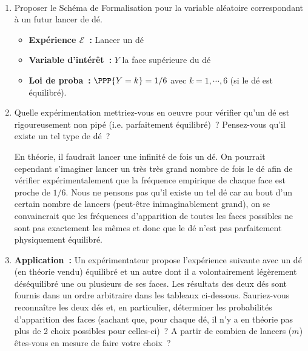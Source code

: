 \documentclass[10pt]{report}
\begin{document}
\begin{exercice}[Lancer d'un dé] ${ }$\label{ex:des}

\begin{enumerate}
\item Proposer le Schéma de Formalisation pour la variable aléatoire correspondant à un futur lancer de dé.\\
\begin{Correction}
\begin{itemize}
\item \textbf{Expérience $\mathcal{E}$~:} Lancer un dé
\item \textbf{Variable d'intérêt~:} $Y$ la face supérieure du dé
\item \textbf{Loi de proba~:} $\PPP{Y=k}=1/6$ avec $k=1,\cdots,6$ (si le dé est équilibré).
\end{itemize}
\end{Correction} 

\item Quelle expérimentation mettriez-vous en oeuvre pour vérifier qu'un dé est rigoureusement non pipé (i.e. parfaitement équilibré)~? Pensez-vous qu'il existe un tel type de dé~?

\begin{Correction}En théorie, il faudrait lancer une infinité de fois un dé. On pourrait cependant s'imaginer lancer un très très grand nombre de fois le dé afin de vérifier expérimentalement que la fréquence empirique de chaque face est proche de $1/6$. Nous ne pensons pas qu'il existe un tel dé car au bout d'un certain nombre de lancers (peut-être inimaginablement grand), on se convaincrait que les  fréquences d'apparition de toutes les faces possibles ne sont pas exactement les mêmes et donc que le dé n'est pas parfaitement physiquement équilibré.
\end{Correction}

\item \textbf{Application~:} Un expérimentateur propose l'expérience suivante avec un dé (en théorie vendu) équilibré et un autre dont il a volontairement légèrement déséquilibré une ou plusieurs de ses faces. Les résultats des deux dés sont fournis dans un ordre arbitraire dans les tableaux ci-dessous. Sauriez-vous reconnaître les deux dés et, en particulier, déterminer les probabilités d'apparition des faces (sachant que, pour chaque dé, il n'y a en théorie pas plus de 2 choix possibles pour celles-ci)~? A partir de combien de lancers ($m$) êtes-vous en mesure de faire votre choix~?


\end{enumerate}
\end{exercice}
\end{document}
